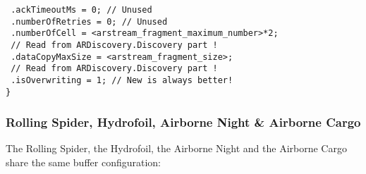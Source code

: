 \begin{itemize}
{    \texttt{  .ackTimeoutMs = 0; // Unused}\\
    \texttt{  .numberOfRetries = 0; // Unused}\\
    \texttt{  .numberOfCell = <arstream\_fragment\_maximum\_number>*2;}\\
    \texttt{                  // Read from ARDiscovery.Discovery part !}\\
    \texttt{  .dataCopyMaxSize = <arstream\_fragment\_size>;}\\
    \texttt{                     // Read from ARDiscovery.Discovery part !}\\
    \texttt{  .isOverwriting = 1; // New is always better!}\\
    \texttt{\}}
}
\end{itemize}

\newpage

\subsubsection{Rolling Spider, Hydrofoil, Airborne Night \& Airborne Cargo}

The Rolling Spider, the Hydrofoil, the Airborne Night and the Airborne Cargo share the same buffer configuration:
